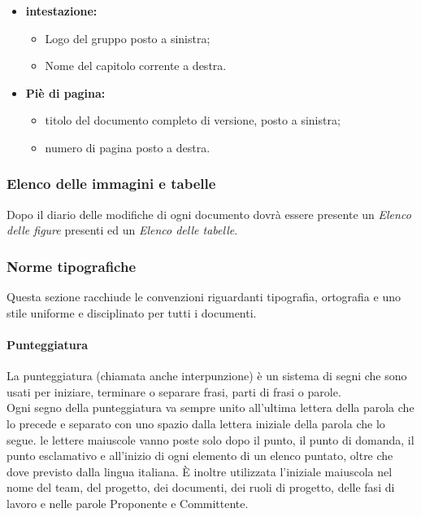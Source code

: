 \begin{itemize}
	\item \textbf{intestazione:}
	\begin{itemize}
		\item Logo del gruppo posto a sinistra;
		\item Nome del capitolo corrente a destra. 
	\end{itemize}
	\item \textbf {Piè di pagina:}
	\begin{itemize}
	\item titolo del documento completo di versione, posto a sinistra;
	\item numero di pagina posto a destra.
	\end{itemize}

\end{itemize} 
 \subsubsection{Elenco delle immagini e tabelle} 
 Dopo il diario delle modifiche di ogni documento dovrà essere presente un \textit{Elenco delle figure} presenti ed un \textit{Elenco delle tabelle}.
\subsubsection{Norme tipografiche}
Questa sezione racchiude le convenzioni riguardanti tipografia, ortografia e uno stile uniforme e disciplinato per tutti i documenti.
\paragraph{Punteggiatura}
La punteggiatura (chiamata anche interpunzione) è un sistema di segni che sono usati per iniziare, terminare o separare frasi, parti di frasi o parole. \\
Ogni segno della punteggiatura va sempre unito all'ultima lettera della parola che lo precede e separato con uno spazio dalla lettera iniziale della parola che lo segue.
le lettere maiuscole vanno poste solo dopo il punto, il punto di domanda, il punto esclamativo e all’inizio di ogni elemento di un elenco puntato, oltre che dove previsto dalla lingua italiana. È inoltre utilizzata l’iniziale maiuscola nel nome del team, del progetto, dei documenti, dei ruoli di progetto, delle fasi di
lavoro e nelle parole Proponente e Committente.
